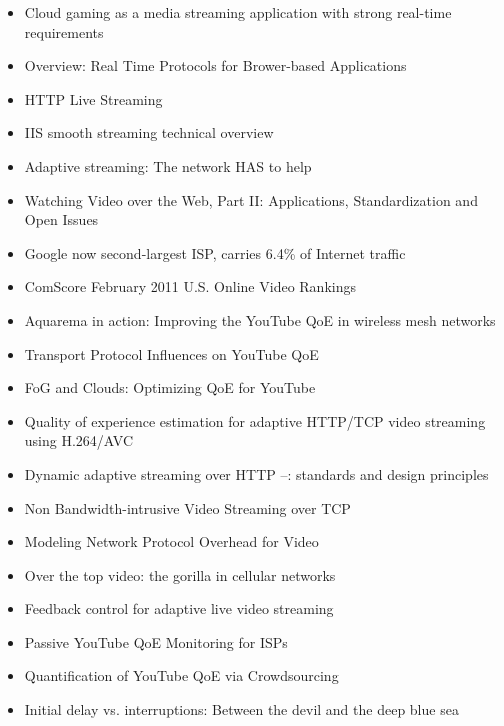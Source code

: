 \begin{itemize}
	\item Cloud gaming as a media streaming application with strong real-time requirements \cite{4795441,wang2009modeling,jarschel2011cloudevaluation,ct2010wolken}

	\item Overview: Real Time Protocols for Brower-based Applications\cite{ietf2011rtcwebdraft}
	\item HTTP Live Streaming \cite{pantos2011livestreaming}
	\item IIS smooth streaming technical overview \cite{zambelli_iis_2009}
	\item Adaptive streaming: The network HAS to help \cite{BLTJ:BLTJ20505}
	\item Watching Video over the Web, Part II: Applications, Standardization and Open Issues \cite{watching-video2}
	\item Google now second-largest ISP, carries 6.4\% of Internet traffic \cite{nw2010carrier}
	\item ComScore February 2011 U.S. Online Video Rankings \cite{comscore2011ranking}
	\item Aquarema in action: Improving the YouTube QoE in wireless mesh networks \cite{5733220}
	\item Transport Protocol Influences on YouTube QoE \cite{report2011-258}
	\item FoG and Clouds: Optimizing QoE for YouTube \cite{hossfeld2011fog}
	\item Quality of experience estimation for adaptive HTTP/TCP video streaming using H.264/AVC \cite{6181070}
	\item Dynamic adaptive streaming over HTTP --: standards and design principles \cite{Stockhammer:2011:DAS:1943552.1943572}
	\item Non Bandwidth-intrusive Video Streaming over TCP \cite{5945211}
	\item Modeling Network Protocol Overhead for Video \cite{5703713}
	\item Over the top video: the gorilla in cellular networks \cite{Erman:2011:OTV:2068816.2068829}
	\item Feedback control for adaptive live video streaming \cite{DeCicco:2011:FCA:1943552.1943573}
	\item Passive YouTube QoE Monitoring for ISPs \cite{6296879}
	\item Quantification of YouTube QoE via Crowdsourcing \cite{6123395}
	\item Initial delay vs. interruptions: Between the devil and the deep blue sea \cite{6263849}

\end{itemize}
